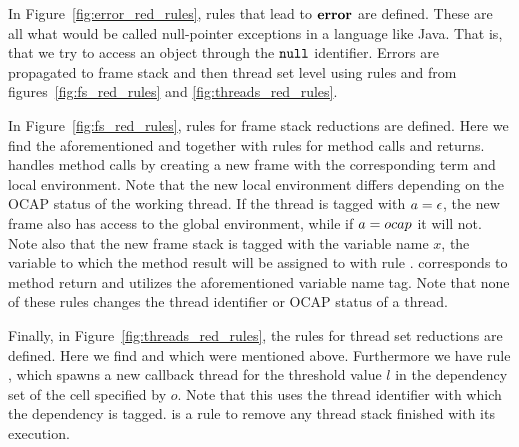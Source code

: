 In Figure~\ref{fig:error_red_rules}, rules that lead to $\mbox{{\bf error}}$ are defined. These
are all what would be called null-pointer exceptions in a language like Java.
That is, that we try to access an object through the $\mbox{\mdseries\texttt{null}}$ identifier.
Errors are propagated to frame stack and then thread set level using rules
\EErrorFS{} and \EErrorP{} from figures~\ref{fig:fs_red_rules} and
\ref{fig:threads_red_rules}.

In Figure~\ref{fig:fs_red_rules}, rules for frame stack reductions are defined.
Here we find the aforementioned \EFProp{} and \EErrorFS{} together with rules
for method calls and returns. \ECall{} handles method calls by creating a new
frame with the corresponding term and local environment. Note that the new local
environment differs depending on the OCAP status of the working thread. If the
thread is tagged with $a = \mbox{$\epsilon$}$, the new frame also has access to the global
environment, while if $a = \mbox{$ocap$}$ it will not. Note also that the new frame
stack is tagged with the variable name $x$, the variable to which the method
result will be assigned to with rule \ERet{}. \ERet{} corresponds to method
return and utilizes the aforementioned variable name tag. Note that none of
these rules changes the thread identifier or OCAP status of a thread.

Finally, in Figure~\ref{fig:threads_red_rules}, the rules for thread set
reductions are defined. Here we find \EFSProp{} and \EErrorP{} which were
mentioned above. Furthermore we have rule \ESpawn{}, which spawns a new callback
thread for the threshold value $l$ in the dependency set of the  cell specified
by $o$. Note that this uses the thread identifier with which the dependency is
tagged. \ETerm{} is a rule to remove any thread stack finished with its
execution.

